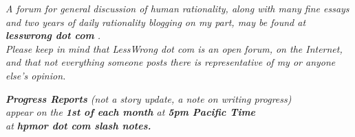 \emph{A forum for general discussion of human rationality, along with many fine essays}\\ \emph{and two years of daily rationality blogging on my part, may be found at \textbf{lesswrong dot com} .}\\ \emph{Please keep in mind that LessWrong dot com is an open forum, on the Internet,}\\ \emph{and that not everything someone posts there is representative of my or anyone else's opinion.}

\emph{\textbf{Progress Reports} (not a story update, a note on writing progress)\\ appear on the \textbf{1st of each month} at \textbf{5pm Pacific Time\\} at \textbf{hpmor dot com slash notes.}}
